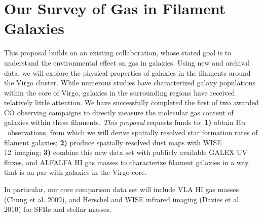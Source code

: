 \documentclass[11pt, preprint]{aastex}
\newcommand{\ha}{H$\alpha$}
\begin{document}
\vspace*{-.8cm}
\section{Our Survey of Gas in Filament Galaxies}
\vspace*{-.4cm}
This proposal builds on an existing collaboration, whose stated goal is to understand the environmental effect on gas in galaxies.  
 Using new and archival data, we will explore the physical properties of
galaxies in the filaments around the Virgo cluster.   
While numerous studies have characterized galaxy populations within the core of Virgo, galaxies in the surrounding regions have received relatively little attention.
%
We have successfully completed the first of two awarded CO observing campaigns to directly measure the molecular gas content of galaxies within these filaments. {\it This proposal} requests funds to: \textbf{1)} obtain \ha\ observations, from which we will derive spatially resolved star formation rates of filament galaxies; \textbf{2)} produce spatially resolved dust maps with WISE 12\micron\ imaging; \textbf{3)} combine this new data set with publicly available GALEX UV fluxes,  and ALFALFA HI gas masses to characterize filament galaxies in a way that is on par with galaxies in the Virgo core. 

In particular, our core comparison data set will include VLA HI gas masses (Chung et al. 2009), and Herschel and WISE infrared imaging (Davies et al. 2010) for SFRs and stellar masses.  

\end{document}
